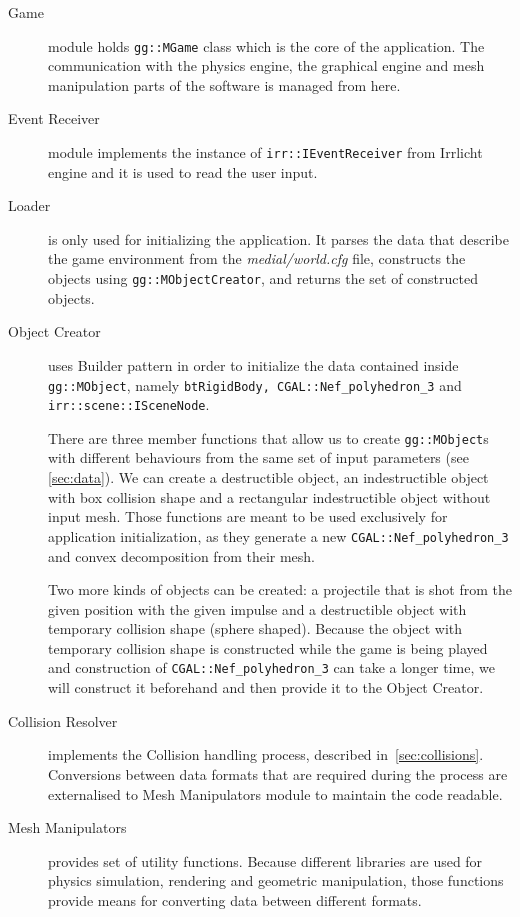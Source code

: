 \begin{description}

\item[Game] module holds {\tt gg::MGame} class which is the core of the application. The communication with the physics engine,  the graphical engine and mesh manipulation parts of the software is managed from here.

\item[Event Receiver] module implements the instance of {\tt irr::IEventReceiver} from Irrlicht engine and it is used to read the user input.

\item[Loader] is only used for initializing the application. It parses the data that describe the game environment from the \emph{medial/world.cfg} file, constructs the objects using {\tt gg::MObjectCreator}, and returns the set of constructed objects.

\item[Object Creator] uses Builder pattern in order to initialize the data contained inside {\tt gg::MObject}, namely {\tt btRigidBody, CGAL::Nef\_polyhedron\_3} and {\tt irr::scene::ISceneNode}.

There are three member functions that allow us to create {\tt gg::MObject}s  with different behaviours from the same set of input parameters (see \cref{sec:data}). We can create a destructible object, an indestructible object with box collision shape and a rectangular indestructible object without input mesh.  Those functions are meant to be used exclusively for application initialization, as they generate a new {\tt CGAL::Nef\_polyhedron\_3} and convex decomposition from their mesh.

Two more kinds of objects can be created: a projectile that is shot from the given position with the given impulse and a destructible object with temporary collision shape (sphere shaped). Because the object with temporary collision shape is constructed while the game is being played and construction of {\tt CGAL::Nef\_polyhedron\_3} can take a longer time, we will construct it beforehand and then provide it to the Object Creator.

\item[Collision Resolver] implements the Collision handling process, described in~\cref{sec:collisions}. Conversions between data formats that are required during the process are externalised to Mesh Manipulators module to maintain the code readable.

\item[Mesh Manipulators] provides set of utility functions. Because different libraries are used for physics simulation, rendering and geometric manipulation, those functions provide means for converting data between different formats.
\end{description}

